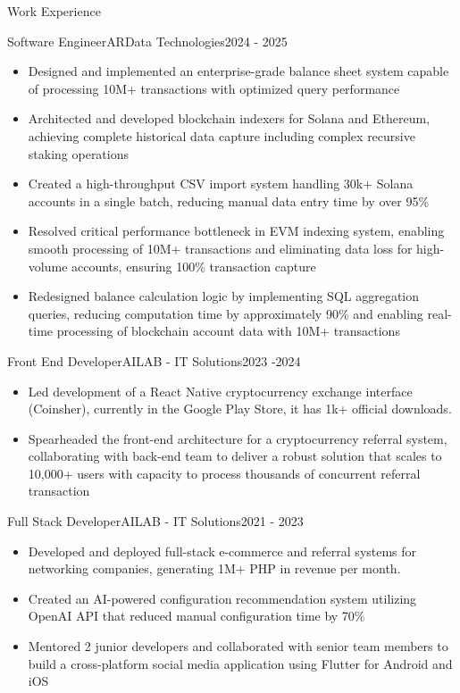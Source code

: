 \documentclass[]{mcdowellcv}
\begin{document}
	\begin{cvsection}{Work Experience}
		\begin{cvsubsection}{Software Engineer}{ARData Technologies}{2024 - 2025}		
			\begin{itemize}
        \item Designed and implemented an enterprise-grade balance sheet system capable of processing 10M+ transactions with optimized query performance
				\item Architected and developed blockchain indexers for Solana and Ethereum, achieving complete historical data capture including complex recursive staking operations
        \item Created a high-throughput CSV import system handling 30k+ Solana accounts in a single batch, reducing manual data entry time by over 95\%
        \item Resolved critical performance bottleneck in EVM indexing system, enabling smooth processing of 10M+ transactions and eliminating data loss for high-volume accounts, ensuring 100\% transaction capture
        \item Redesigned balance calculation logic by implementing SQL aggregation queries, reducing computation time by approximately 90\% and enabling real-time processing of blockchain account data with 10M+ transactions
			\end{itemize}
		\end{cvsubsection}
		
		\begin{cvsubsection}{Front End Developer}{AILAB - IT Solutions}{2023 -2024}		
			\begin{itemize}
				\item Led development of a React Native cryptocurrency exchange interface (Coinsher), currently in the Google Play Store, it has 1k+ official downloads.
				\item Spearheaded the front-end architecture for a cryptocurrency referral system, collaborating with back-end team to deliver a robust solution that scales to 10,000+ users with capacity to process thousands of concurrent referral transaction
			\end{itemize}
		\end{cvsubsection}
		
		\begin{cvsubsection}{Full Stack Developer}{AILAB - IT Solutions}{2021 - 2023}
			\begin{itemize}
				\item Developed and deployed full-stack e-commerce and referral systems for networking companies, generating 1M+ PHP in revenue per month.
				\item Created an AI-powered configuration recommendation system utilizing OpenAI API that reduced manual configuration time by 70\%
        \item Mentored 2 junior developers and collaborated with senior team members to build a cross-platform social media application using Flutter for Android and iOS
			\end{itemize}
		\end{cvsubsection}
	\end{cvsection}
\end{document}
